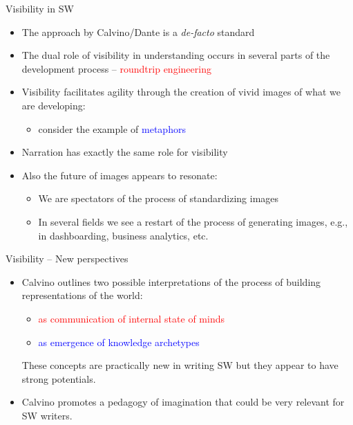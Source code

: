 \documentclass{beamer}
\begin{document}
\begin{frame}
{\centerline{Visibility in SW}}

\begin{itemize}
    \item The approach by Calvino/Dante is a \textit{de-facto} standard
    \item The dual role of visibility in understanding occurs in several parts of the development process -- \textcolor{red}{roundtrip engineering}
    \item Visibility facilitates agility through the creation of vivid images of what we are developing:
    \begin{itemize}
    \item consider the example of \textcolor{blue}{metaphors}
    \end{itemize}
    \item Narration has exactly the same role for visibility
    \item Also the future of images appears to resonate:
    \begin{itemize}
    \item We are spectators of the process of standardizing images
    \item In several fields we see a restart of the process of generating images, e.g., in dashboarding, business analytics, etc.
    \end{itemize}
\end{itemize}

\end{frame}

\begin{frame}
{\centerline{Visibility -- New perspectives}}
\begin{itemize}
\item Calvino outlines two possible interpretations of the process of building representations of the world:
\begin{itemize}
    \item \textcolor{red}{as communication of internal state of minds}
    \item \textcolor{blue}{as emergence of knowledge archetypes} 
\end{itemize}
These concepts are practically new in writing SW but they appear to have strong potentials. \vspace{0.3cm}
\item Calvino promotes a pedagogy of imagination that could be very relevant for SW writers.

\end{itemize}

\end{frame}
\end{document}

